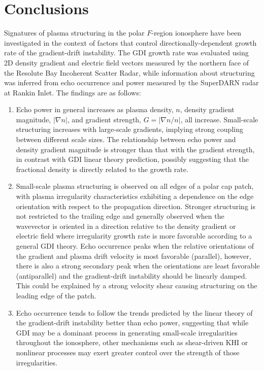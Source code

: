 \section{Conclusions}
Signatures of plasma structuring in the polar \(F\)-region ionosphere have been investigated in the context of factors that control directionally-dependent growth rate of the gradient-drift instability.  The GDI growth rate was evaluated using 2D density gradient and electric field vectors measured by the northern face of the Resolute Bay Incoherent Scatter Radar, while information about structuring was inferred from echo occurrence and power measured by the SuperDARN radar at Rankin Inlet.  The findings are as follows:
\begin{enumerate}
	\item Echo power in general increases as plasma density, \(n\), density gradient magnitude, \(|\nabla n|\), and gradient strength, \(G = |\nabla n/n|\), all increase.  Small-scale structuring increases with large-scale gradients, implying strong coupling between different scale sizes.  The relationship between echo power and density gradient magnitude is stronger than that with the gradient strength, in contrast with GDI linear theory prediction, possibly suggesting that the fractional density is directly related to the growth rate.
	\item Small-scale plasma structuring is observed on all edges of a polar cap patch, with plasma irregularity characteristics exhibiting a dependence on the edge orientation with respect to the propagation direction. Stronger structuring is not restricted to the trailing edge and generally observed when the wavevector is oriented in a direction relative to the density gradient or electric field where irregularity growth rate is more favorable according to a general GDI theory.  Echo occurrence peaks when the relative orientations of the gradient and plasma drift velocity is most favorable (parallel), however, there is also a strong secondary peak when the orientations are least favorable (antiparallel) and the gradient-drift instability should be linearly damped.  This could be explained by a strong velocity shear causing structuring on the leading edge of the patch.
	\item Echo occurrence tends to follow the trends predicted by the linear theory of the gradient-drift instability better than echo power, suggesting that while GDI may be a dominant process in generating small-scale irregularities throughout the ionosphere, other mechanisms such as shear-driven KHI or nonlinear processes may exert greater control over the strength of those irregularities.
\end{enumerate}



